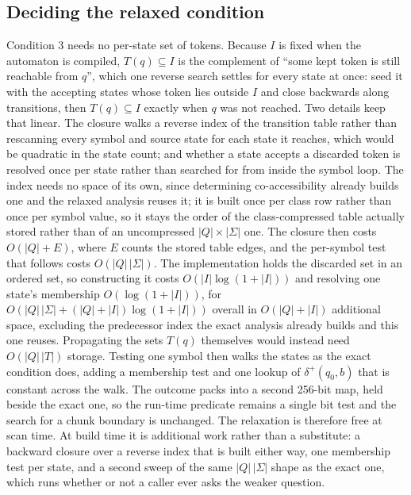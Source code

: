 \documentclass[11pt,a4paper]{article}
\theoremstyle{definition}
\theoremstyle{plain}
\begin{document}
\subsection{Deciding the relaxed condition}
\label{sec:decide}

Condition 3 needs no per-state set of tokens. Because $I$ is fixed when the automaton is compiled, $T(q) \subseteq I$
is the complement of ``some kept token is still reachable from $q$'', which one reverse search settles for every state
at once: seed it with the accepting states whose token lies outside $I$ and close backwards along transitions, then
$T(q) \subseteq I$ exactly when $q$ was not reached. Two details keep that linear. The closure walks a reverse index
of the transition table rather than rescanning every symbol and source state for each state it reaches, which would be
quadratic in the state count; and whether a state accepts a discarded token is resolved once per state rather than
searched for from inside the symbol loop. The index needs no space of its own, since determining co-accessibility
already builds one and the relaxed analysis reuses it; it is built once per class row rather than once per symbol
value, so it stays the order of the class-compressed table actually stored rather than of an uncompressed $|Q| \times
|\Sigma|$ one. The closure then costs $O(|Q| + E)$, where $E$ counts the stored table edges, and the per-symbol test
that follows costs $O(|Q|\,|\Sigma|)$. The implementation holds the discarded set in an ordered set, so constructing
it costs $O(|I| \log(1 + |I|))$ and resolving one state's membership $O(\log(1 + |I|))$, for
$O(|Q|\,|\Sigma| + (|Q| + |I|) \log(1 + |I|))$ overall in $O(|Q| + |I|)$ additional space, excluding the predecessor
index the exact analysis already builds and this one reuses.
Propagating the sets $T(q)$ themselves would instead need $O(|Q|\,|T|)$ storage. Testing one symbol then walks the
states as the exact condition does, adding a membership test and one lookup of $\delta^+(q_0, b)$ that is constant
across the walk. The outcome packs into a second 256-bit map, held beside the exact one, so the run-time predicate
remains a single bit test and the search for a chunk boundary is unchanged. The relaxation is therefore free at scan
time. At build time it is additional work rather than a substitute: a backward closure over a reverse index that is
built either way, one membership test per state, and a second sweep of the same $|Q|\,|\Sigma|$ shape as the exact
one, which runs whether or not a caller ever asks the weaker question.
\end{document}
